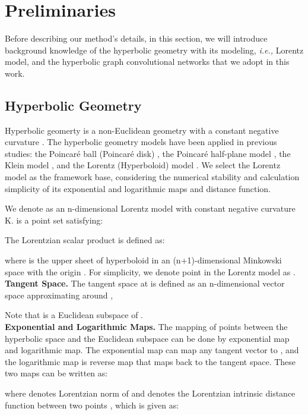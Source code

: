 \documentclass[sigconf]{acmart}
\newcommand{\ie}{{\emph{i.e., }}}
\newcommand{\poincare}{Poincar\'e }
\begin{document}
\section{Preliminaries}
Before describing our method's details, in this section, we will introduce background knowledge of the hyperbolic geometry with its modeling, \ie Lorentz model, and the hyperbolic graph convolutional networks that we adopt in this work.
\subsection{Hyperbolic Geometry}
\label{subsec:3_1}
Hyperbolic geomerty is a non-Euclidean geometry with a constant negative curvature . The hyperbolic geometry models have been applied in previous studies: the \poincare ball (\poincare disk) \cite{ganea2018hyperbolic}, the \poincare half-plane model \cite{tifrea2018poincar}, the Klein model \cite{gulcehre2018hyperbolic}, and the Lorentz (Hyperboloid) model \cite{Nickel_Kiela_2018}. We select the Lorentz model as the framework base, considering the numerical stability and calculation simplicity of its exponential and logarithmic maps and distance function.

We denote  as an n-dimensional Lorentz model with constant negative curvature K.  is a point set satisfying:

The Lorentzian scalar product is defined as:

where  is the upper sheet of hyperboloid in an (n+1)-dimensional Minkowski space with the origin . For simplicity, we denote point  in the Lorentz model as .\\

\noindent\textbf{Tangent Space.} The tangent space at  is defined as an n-dimensional vector space approximating  around ,

Note that  is a Euclidean subspace of .\\

\noindent\textbf{Exponential and Logarithmic Maps.} The mapping of points between the hyperbolic space  and the Euclidean subspace  can be done by exponential map and logarithmic map. The exponential map can map any tangent vector  to , and the logarithmic map is reverse map that maps back to the tangent space. These two maps can be written as:

where  denotes Lorentzian norm of  and  denotes the Lorentzian intrinsic distance function between two points , which is given as:
\end{document}
